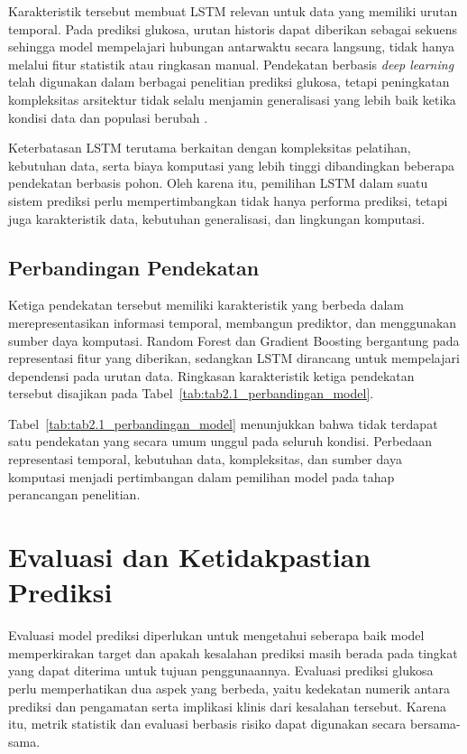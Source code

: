 Karakteristik tersebut membuat LSTM relevan untuk data yang memiliki urutan temporal. Pada prediksi glukosa, urutan historis dapat diberikan sebagai sekuens sehingga model 
mempelajari hubungan antarwaktu secara langsung, tidak hanya melalui fitur statistik atau ringkasan manual. Pendekatan berbasis \textit{deep learning} telah digunakan dalam berbagai
penelitian prediksi glukosa, tetapi peningkatan kompleksitas arsitektur tidak selalu menjamin generalisasi yang lebih baik ketika kondisi data dan populasi berubah \parencite{ghimire2024}.

Keterbatasan LSTM terutama berkaitan dengan kompleksitas pelatihan, kebutuhan data, serta biaya komputasi yang lebih tinggi dibandingkan beberapa pendekatan berbasis pohon. 
Oleh karena itu, pemilihan LSTM dalam suatu sistem prediksi perlu mempertimbangkan tidak hanya performa prediksi, tetapi juga karakteristik data, kebutuhan generalisasi, dan 
lingkungan komputasi.

\subsection{Perbandingan Pendekatan}
\label{subsec:bab2-perbandingan-pendekatan}

Ketiga pendekatan tersebut memiliki karakteristik yang berbeda dalam merepresentasikan informasi temporal, membangun prediktor, dan menggunakan sumber daya komputasi. Random Forest 
dan Gradient Boosting bergantung pada representasi fitur yang diberikan, sedangkan LSTM dirancang untuk mempelajari dependensi pada urutan data. Ringkasan karakteristik ketiga 
pendekatan tersebut disajikan pada Tabel~\ref{tab:tab2.1_perbandingan_model}.



Tabel~\ref{tab:tab2.1_perbandingan_model} menunjukkan bahwa tidak terdapat satu pendekatan yang secara umum unggul pada seluruh kondisi. Perbedaan representasi temporal, kebutuhan 
data, kompleksitas, dan sumber daya komputasi menjadi pertimbangan dalam pemilihan model pada tahap perancangan penelitian.

\section{Evaluasi dan Ketidakpastian Prediksi}
\label{sec:bab2-evaluasi-ketidakpastian-prediksi}

Evaluasi model prediksi diperlukan untuk mengetahui seberapa baik model memperkirakan target dan apakah kesalahan prediksi masih berada pada tingkat yang dapat diterima untuk 
tujuan penggunaannya. Evaluasi prediksi glukosa perlu memperhatikan dua aspek yang berbeda, yaitu kedekatan numerik antara prediksi dan pengamatan serta implikasi klinis dari
kesalahan tersebut. Karena itu, metrik statistik dan evaluasi berbasis risiko dapat digunakan secara bersama-sama.

